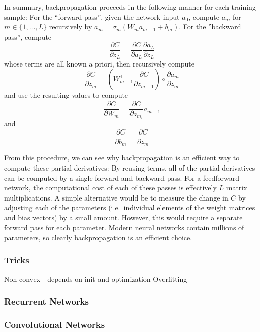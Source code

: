 In summary, backpropagation proceeds in the following manner for each training sample: For the ``forward pass'', given the network input $a_0$, compute $a_m$ for $m \in \{1, \ldots, L\}$ recursively by $a_m = \sigma_m(W_m a_{m - 1} + b_m)$.
For the ''backward pass'', compute
\begin{equation}
\frac{\partial C}{\partial z_L} = \frac{\partial C}{\partial a_L} \frac{\partial a_L}{\partial z_L}
\end{equation}
whose terms are all known a priori, then recursively compute
\begin{equation}
\frac{\partial C}{\partial z_m} = \left(W_{m + 1}^\top \frac{\partial C}{\partial z_{m + 1}}\right) \circ \frac{\partial a_m}{\partial z_m}
\end{equation}
and use the resulting values to compute
\begin{equation}
\frac{\partial C}{\partial W_m} = \frac{\partial C}{\partial z_{m_i}} a_{m - 1}^\top
\end{equation}
and
\begin{equation}
\frac{\partial C}{\partial b_m} = \frac{\partial C}{\partial z_m}
\end{equation}

From this procedure, we can see why backpropagation is an efficient way to compute these partial derivatives: By reusing terms, all of the partial derivatives can be computed by a single forward and backward pass.
For a feedforward network, the computational cost of each of these passes is effectively $L$ matrix multiplications.
A simple alternative would be to measure the change in $C$ by adjusting each of the parameters (i.e.\ individual elements of the weight matrices and bias vectors) by a small amount.
However, this would require a separate forward pass for each parameter.
Modern neural networks contain millions of parameters, so clearly backpropagation is an efficient choice.


\subsubsection{Tricks}

Non-convex - depends on init and optimization
Overfitting

\subsubsection{Recurrent Networks}

\subsubsection{Convolutional Networks}

